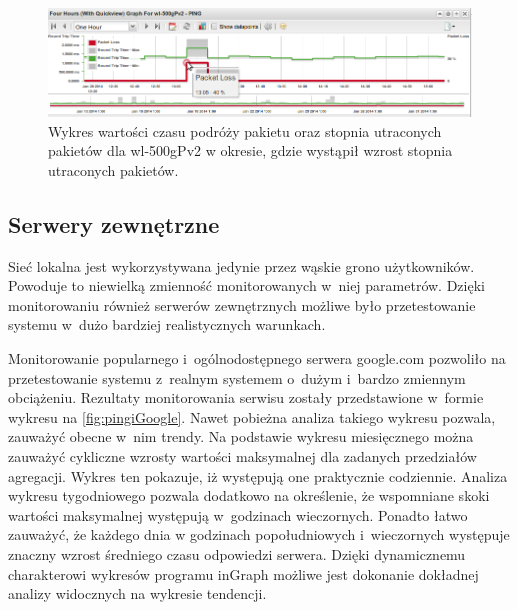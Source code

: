 \begin{figure}[ht]
  \caption{Wykres wartości czasu podróży pakietu oraz stopnia
    utraconych pakietów dla wl-500gPv2 w okresie, gdzie wystąpił wzrost stopnia utraconych pakietów.}
  \label{fig:pingRouteraDokladny}
  \centering
\includegraphics[width=1\textwidth]{img/pingiRouterDokladny.png}
\end{figure}

\subsection[Serwery zewnętrzne][Serwery zewnętrzne]{Serwery zewnętrzne}

Sieć lokalna jest wykorzystywana jedynie przez wąskie grono
użytkowników. Powoduje to niewielką zmienność monitorowanych w~niej
parametrów. Dzięki monitorowaniu również serwerów zewnętrznych możliwe
było przetestowanie systemu w~dużo bardziej realistycznych warunkach.

Monitorowanie popularnego i~ogólnodostępnego serwera google.com
pozwoliło na przetestowanie systemu z~realnym systemem o~dużym
i~bardzo zmiennym obciążeniu. Rezultaty monitorowania serwisu zostały
przedstawione w~formie wykresu na \ref{fig:pingiGoogle}. Nawet
pobieżna analiza takiego wykresu pozwala, zauważyć obecne w~nim
trendy. Na podstawie wykresu miesięcznego można zauważyć cykliczne
wzrosty wartości maksymalnej dla zadanych przedziałów
agregacji. Wykres ten pokazuje, iż występują one praktycznie
codziennie. Analiza wykresu tygodniowego pozwala dodatkowo na
określenie, że wspomniane skoki wartości maksymalnej występują
w~godzinach wieczornych. Ponadto łatwo zauważyć, że każdego dnia w
godzinach popołudniowych i~wieczornych występuje znaczny wzrost
średniego czasu odpowiedzi serwera. Dzięki dynamicznemu charakterowi
wykresów programu inGraph możliwe jest dokonanie dokładnej analizy
widocznych na wykresie tendencji.

